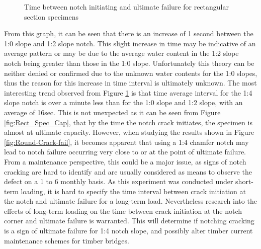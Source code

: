 \documentclass[11pt,a4paper]{article}
\numberwithin{equation}{subsection}
\begin{document}
\vspace*{\baselineskip}

\begin{figure}[h]
	\begin{center}
	\end{center}
	\caption{Time between notch initiating and ultimate failure for rectangular section specimens}
	\label{fig:Rect_Time}
\end{figure}

\noindent
From this graph, it can be seen that there is an increase of 1 second between the 1:0 slope and 1:2 slope notch. This slight increase in time may be indicative of an average pattern or may be due to the average water content in the 1:2 slope notch being greater than those in the 1:0 slope. Unfortunately this theory can be neither denied or confirmed due to the unknown water contents for the 1:0 slopes, thus the reason for this increase in time interval is ultimately unknown. The most interesting trend observed from Figure \ref{fig:Rect_Time} is that time average interval for the 1:4 slope notch is over a minute less than for the 1:0 slope and 1:2 slope, with an average of 16sec. This is not unexpected as it can be seen from Figure \ref{fig:Rect_Spec_Cap}, that by the time the notch crack initiates, the specimen is almost at ultimate capacity. However, when studying the results shown in Figure \ref{fig:Round-Crack-fail}, it becomes apparent that using a 1:4 chamfer notch may lead to notch failure occurring very close to or at the point of ultimate failure. From a maintenance perspective, this could be a major issue, as signs of notch cracking are hard to identify and are usually considered as means to observe the defect on a 1 to 6 monthly basis. As this experiment was conducted under short-term loading, it is hard to specify the time interval between crack initiation at the notch and ultimate failure for a long-term load. Nevertheless research into the effects of long-term loading on the time between crack initiation at the notch corner and ultimate failure is warranted. This will determine if notching cracking is a sign of ultimate failure for 1:4 notch slope, and possibly alter timber current maintenance schemes for timber bridges.
\end{document}
